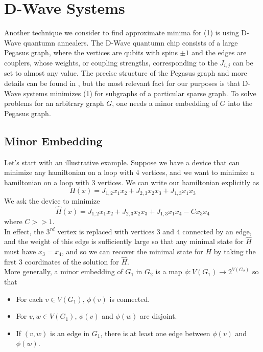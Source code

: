 \documentclass[12pt]{article}
\newcommand{\1}{\mathbf{1}}
\theoremstyle{remark}
\theoremstyle{definition}
\theoremstyle{proposition}
\theoremstyle{lemma}
\theoremstyle{definition}
\begin{document}
	\section{D-Wave Systems}
	\indent \indent Another technique we consider to find approximate minima for  (1) is using D-Wave quantumn annealers. The D-Wave quantumn chip consists of a large Pegasus graph, where the vertices are qubits with spins $\pm 1$ and the edges are couplers, whose weights, or coupling strengths, corresponding to the $J_{i,  j}$ can be set to almost any value. The precise structure of the Pegasus graph and more details can be found in \cite{dattani2019pegasus}, but the most relevant fact for our purposes is that D-Wave systems minimizes  (1) for subgraphs of a particular sparse graph. To solve problems for an arbitrary graph $G$, one needs a minor embedding of $G$ into the Pegasus graph.
	
	\subsection{Minor Embedding}
	\indent \indent Let's start with an illustrative example. Suppose we have a device that can minimize any hamiltonian on a loop with 4 vertices, and we want to minimize a hamiltonian on a loop with 3 vertices. We can write our hamiltonian explicitly as
	$$H(x) = J_{1, 2} x_1x_2 + J_{2, 3} x_2x_3  + J_{1, 3}x_1x_3$$
	We ask the device to minimize
	$$\hat{H}(x) = J_{1, 2} x_1x_2 + J_{2, 3}x_2x_3 + J_{1,3}x_1x_4 - Cx_3x_4$$
	where $C >> 1$. \\
	In effect,  the $3^{rd}$ vertex is replaced with vertices $3$ and $4$ connected by an edge, and the weight of this edge is sufficiently large so that any minimal state for $\hat{H}$ must have $x_3 = x_4$, and so we can recover the minimal state for $H$ by taking the first 3 coordinates of the solution for $\hat{H}$. \\
	\indent More generally, a minor embedding of $G_1$ in $G_2$ is a map $\phi: V(G_1) \rightarrow 2^{V(G_2)}$ so that 
	
	\begin{itemize}
		\item For each $v \in V(G_1)$, $\phi(v)$ is connected.
		\item For $v, w \in V(G_1)$, $\phi(v)$ and $\phi(w)$ are disjoint.
		\item If $(v, w)$ is an edge in $G_1$, there is at least one edge between $\phi(v)$ and $\phi(w)$.
		\end{itemize}
	
\end{document}
